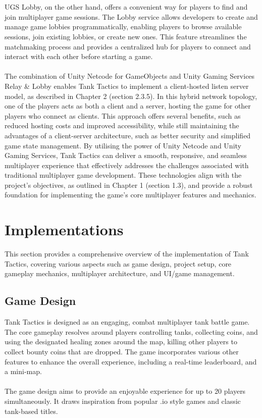 \\
\noindent
\\
UGS Lobby, on the other hand, offers a convenient way for players to find and join multiplayer game sessions. The Lobby service allows developers to create and manage game lobbies programmatically, enabling players to browse available sessions, join existing lobbies, or create new ones. This feature streamlines the matchmaking process and provides a centralized hub for players to connect and interact with each other before starting a game.
\\
\noindent
\\
The combination of Unity Netcode for GameObjects and Unity Gaming Services Relay \& Lobby enables Tank Tactics to implement a client-hosted listen server model, as described in Chapter 2 (section 2.3.5). In this hybrid network topology, one of the players acts as both a client and a server, hosting the game for other players who connect as clients. This approach offers several benefits, such as reduced hosting costs and improved accessibility, while still maintaining the advantages of a client-server architecture, such as better security and simplified game state management. By utilising the power of Unity Netcode and Unity Gaming Services, Tank Tactics can deliver a smooth, responsive, and seamless multiplayer experience that effectively addresses the challenges associated with traditional multiplayer game development. These technologies align with the project's objectives, as outlined in Chapter 1 (section 1.3), and provide a robust foundation for implementing the game's core multiplayer features and mechanics.

\section{Implementations}
This section provides a comprehensive overview of the implementation of Tank Tactics, covering various aspects such as game design, project setup, core gameplay mechanics, multiplayer architecture, and UI/game management.

\subsection{Game Design}
Tank Tactics is designed as an engaging, combat multiplayer tank battle game. The core gameplay resolves around players controlling tanks, collecting coins, and using the designated healing zones around the map, killing other players to collect bounty coins that are dropped. The game incorporates various other features to enhance the overall experience, including a real-time leaderboard, and a mini-map.
\\
\noindent
\\
The game design aims to provide an enjoyable experience for up to 20 players simultaneously. It draws inspiration from popular .io style games and classic tank-based titles.

